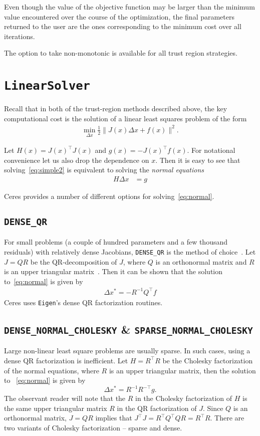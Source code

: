 Even though the value of the objective function may be larger
than the minimum value encountered over the course of the
optimization, the final parameters returned to the user are the
ones corresponding to the minimum cost over all iterations.

The option to take non-monotonic is available for all trust region
strategies.

\section{\texttt{LinearSolver}}
Recall that in both of the trust-region methods described above, the key computational cost is the solution of a linear least squares problem of the form
\begin{align}
 \min_{\Delta x} \frac{1}{2} \|J(x)\Delta x + f(x)\|^2 .
 \label{eq:simple2}
\end{align}


Let $H(x)= J(x)^\top J(x)$ and $g(x) = -J(x)^\top  f(x)$. For notational convenience let us also drop the dependence on $x$. Then it is easy to see that solving~\eqref{eq:simple2} is equivalent to solving the {\em normal equations}
\begin{align}
H \Delta x  &= g \label{eq:normal}
\end{align}

Ceres provides a number of different options for solving~\eqref{eq:normal}.

\subsection{\texttt{DENSE\_QR}}
For small problems (a couple of hundred parameters and a few thousand residuals) with relatively dense Jacobians, \texttt{DENSE\_QR} is the method of choice~\cite{bjorck1996numerical}. Let $J = QR$ be the QR-decomposition of $J$, where $Q$ is an orthonormal matrix and $R$ is an upper triangular matrix~\cite{trefethen1997numerical}. Then it can be shown that the solution to~\eqref{eq:normal} is given by
\begin{align}
    \Delta x^* = -R^{-1}Q^\top f
\end{align}
Ceres uses \texttt{Eigen}'s dense QR factorization routines.

\subsection{\texttt{DENSE\_NORMAL\_CHOLESKY} \& \texttt{SPARSE\_NORMAL\_CHOLESKY}}
Large non-linear least square problems are usually sparse. In such cases, using a dense QR factorization is inefficient. Let $H = R^\top R$ be the Cholesky factorization of the normal equations, where $R$ is an upper triangular matrix, then the  solution to ~\eqref{eq:normal} is given by
\begin{equation}
    \Delta x^* = R^{-1} R^{-\top} g.
\end{equation}
The observant reader will note that the $R$ in the Cholesky
factorization of $H$ is the same upper triangular matrix $R$ in the QR
factorization of $J$. Since $Q$ is an orthonormal matrix, $J=QR$
implies that $J^\top J = R^\top Q^\top Q R = R^\top R$. There are two variants of Cholesky factorization -- sparse and
dense.

